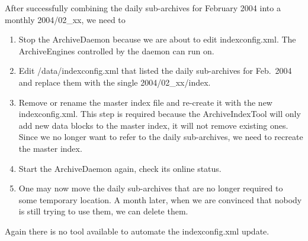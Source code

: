 After successfully combining the daily sub-archives for February 2004
into a monthly 2004/02\_xx, we need to
\begin{enumerate}
\item Stop the ArchiveDaemon because we are about to edit
      indexconfig.xml.
      The ArchiveEngines controlled by the daemon can run on.
\item Edit /data/indexconfig.xml that listed the daily sub-archives for
      Feb.\ 2004 and replace them with the single 2004/02\_xx/index.
\item Remove or rename the master index file and re-create it with the new
      indexconfig.xml. This step is required because the ArchiveIndexTool
      will only add new data blocks to the master index, it will not
      remove existing ones. Since we no longer want to refer to the
      daily sub-archives, we need to recreate the master index.
\item Start the ArchiveDaemon again, check its online status.
\item One may now move the daily sub-archives that are no longer
      required to some temporary location. A month later, when we are
      convinced that nobody is still trying to use them, we can delete
      them.
\end{enumerate}

\noindent Again there is no tool available to automate the
indexconfig.xml update.